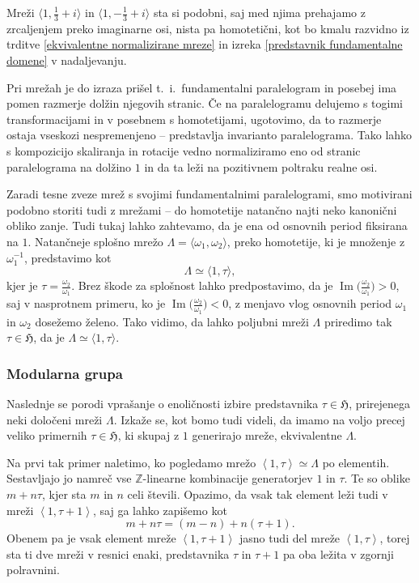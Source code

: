 \documentclass[mat1]{fmfdelo}
\numberwithin{equation}{section}
\newcommand{\Z}{\mathbb Z}
\newcommand{\HH}{\mathfrak{H}}
\newcommand{\om}{\omega}
\newcommand{\inv}{^{-1}}
\newcommand{\htp}{\simeq}
\newcommand{\lattice}[2]{\left\langle #1, #2 \right\rangle}
\renewcommand\Im{\operatorname{Im}}%
\newcommand{\ti}{t.~i.\ }
\theoremstyle{definition}
\begin{document}
\begin{primer*}
    Mreži $\langle 1, \frac{1}{3} + i \rangle$ in $\langle 1, -\frac{1}{3} + i \rangle$ sta si podobni, saj med njima prehajamo z zrcaljenjem preko imaginarne osi, nista pa homotetični, kot bo kmalu razvidno iz trditve \ref{ekvivalentne normalizirane mreze} in izreka \ref{predstavnik fundamentalne domene} v nadaljevanju. 
\end{primer*}
Pri mrežah je do izraza prišel \ti fundamentalni paralelogram in posebej ima pomen razmerje dolžin njegovih stranic. Če na paralelogramu delujemo s togimi transformacijami in v posebnem s homotetijami, ugotovimo, da to razmerje ostaja vseskozi nespremenjeno -- predstavlja invarianto paralelograma. Tako lahko s kompozicijo skaliranja in rotacije vedno normaliziramo eno od stranic paralelograma na dolžino $1$ in da ta leži na pozitivnem poltraku realne osi.  

Zaradi tesne zveze mrež s svojimi fundamentalnimi paralelogrami, smo motivirani podobno storiti tudi z mrežami -- do homotetije natančno najti neko kanonični obliko zanje. 
Tudi tukaj lahko zahtevamo, da je ena od osnovnih period fiksirana na $1$. Natančneje splošno mrežo $\Lambda = \langle \om_1, \om_2 \rangle$, preko homotetije, ki je množenje z $\om_1\inv$, predstavimo kot
\[
    \Lambda \htp \langle 1, \tau \rangle,
\]
kjer je $\tau = \frac{\om_2}{\om_1}$. Brez škode za splošnost lahko predpostavimo, da je $\Im\big(\frac{\om_2}{\om_1}\big) > 0$, saj v nasprotnem primeru, ko je $\Im\big(\frac{\om_2}{\om_1}\big) < 0$, z menjavo vlog osnovnih period $\om_1$ in $\om_2$ dosežemo želeno. Tako vidimo, da lahko poljubni mreži $\Lambda$ priredimo tak $\tau \in \HH$, da je $\Lambda \htp \langle 1, \tau \rangle$.

\subsubsection{Modularna grupa}
Naslednje se porodi vprašanje o enoličnosti izbire predstavnika $\tau \in \HH$, prirejenega neki določeni mreži $\Lambda$. Izkaže se, kot bomo tudi videli, da imamo na voljo precej veliko primernih $\tau \in \HH$, ki skupaj z $1$ generirajo mreže, ekvivalentne $\Lambda$. 

Na prvi tak primer naletimo, ko pogledamo mrežo $\lattice{1}{\tau} \htp \Lambda$ po elementih.
Sestavljajo jo namreč vse $\Z$-linearne kombinacije generatorjev $1$ in $\tau$. Te so oblike $m + n\tau$, kjer sta $m$ in $n$ celi števili. Opazimo, da vsak tak element leži tudi v mreži $\lattice{1}{\tau + 1}$, saj ga lahko zapišemo kot
\[
    m + n\tau = (m - n) + n(\tau + 1).
\] 
Obenem pa je vsak element mreže $\lattice{1}{\tau + 1}$ jasno tudi del mreže $\lattice{1}{\tau}$, torej sta ti dve mreži v resnici enaki, predstavnika $\tau$ in $\tau + 1$ pa oba ležita v zgornji polravnini.
\end{document}
